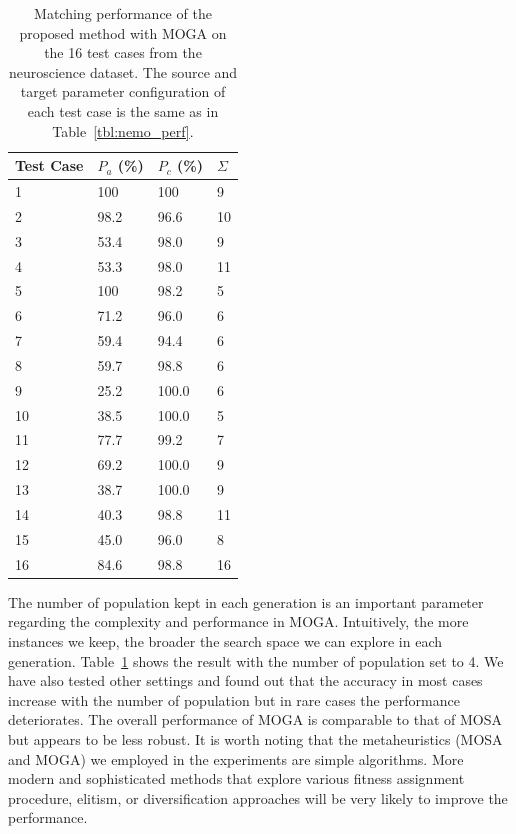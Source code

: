 \begin{table}[tbh]
\begin{center}
\begin{tabular}{l|l|l|l}
\hline
Test Case	&	$P_a$ (\%)	&	$P_c$ (\%) &   $\Sigma$    \\
\hline
1	&	100	&	100	  &   9\\
2	&	98.2	&	96.6	&   10\\
3	&	53.4	&	98.0	 &  9\\
4	&	53.3	&	98.0	&   11\\
5	&	100	&	98.2	&    5\\
6	&	71.2	&	96.0	&   6\\
7	&	59.4	&	94.4	&   6\\
8	&	59.7	&	98.8	&   6\\
9	&	25.2	&	100.0	&6 \\
10	&	38.5	&	100.0	& 5\\
11	&	77.7	&	99.2	&  7\\
12	&	69.2	&	100.0	& 9\\
13	&	38.7	&	100.0	& 9\\
14	&	40.3	&	98.8	&  11\\
15	&	45.0	&	96.0	&  8\\
16	&	84.6	&	98.8	&  16\\
\hline
\end{tabular}
\end{center}
\caption[The performance of MOGA on the neuroscience dataset]{\label{tbl:moga_neuro} Matching performance of the proposed method with MOGA on the 16 test cases from the neuroscience dataset. The source and target parameter configuration of each test case is the same as in Table~\ref{tbl:nemo_perf}.}
\end{table}

The number of population kept in each generation is an important parameter regarding the complexity and performance in MOGA. Intuitively, the more instances we keep, the broader the search space we can explore in each generation. Table~\ref{tbl:moga_neuro} shows the result with the number of population set to 4. We have also tested other settings and found out that the accuracy in most cases increase with the number of population but in rare cases the performance deteriorates. The overall performance of MOGA is comparable to that of MOSA but appears to be less robust. It is worth noting that the metaheuristics (MOSA and MOGA) we employed in the experiments are simple algorithms. More modern and sophisticated methods that explore various fitness assignment procedure, elitism, or diversification approaches will be very likely to improve the performance.


